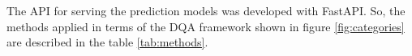 The API for serving the prediction models was developed with FastAPI. So, the methods applied in terms of the DQA framework shown in figure \ref{fig:categories} are described in the table \ref{tab:methods}.







